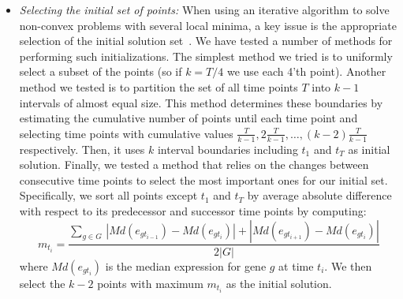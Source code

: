\documentclass[10pt]{article}
\begin{document}
\begin{itemize}
\item {\em Selecting the initial set of points:} When using an iterative algorithm to solve non-convex problems with several local minima,
a key issue is the appropriate selection of the initial solution set~\cite{kmeans, mixture}. We have tested a number
of methods for performing such initializations. The simplest method
we tried is to uniformly select a subset of the points (so if
$k=T/4$ we use each 4'th point). Another method we tested is to partition the set
of all time points $T$ into $k-1$ intervals of almost equal size. This
method determines these boundaries by estimating the cumulative number of points until each time point and
selecting time points with cumulative values $\frac{T}{k-1}, 2\frac{T}{k-1},
\ldots, (k-2)\frac{T}{k-1}$ respectively. Then, it uses $k$ interval
boundaries including $t_{1}$ and $t_{T}$ as initial solution. Finally, we tested a
method that relies on the changes between consecutive time points to
select the most important ones for our initial set. Specifically, we sort all points except $t_{1}$ and $t_{T}$ by average
absolute difference with respect to its predecessor and successor time points by
computing:
%
\begin{equation}
m_{t_{i}} = \frac{\sum_{g \in G}\,|Md(e_{g t_{i-1}}) - Md(e_{g t_{i}})| + |Md(e_{g t_{i+1}}) - Md(e_{g t_{i}})|}{2|G|}
\end{equation}
%
where $Md(e_{g t_{i}})$ is the median expression for gene $g$ at
time $t_{i}$. We then select the $k-2$ points with maximum $m_{t_{i}}$
as the initial solution.


\end{itemize}
\end{document}
